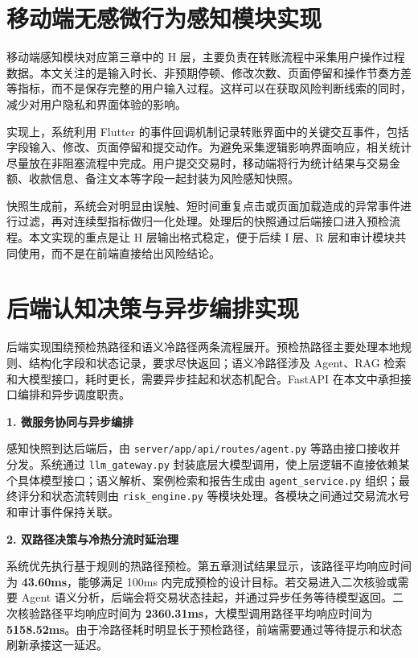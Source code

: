 \documentclass{xduugthesis}
\begin{document}
\section{移动端无感微行为感知模块实现}

移动端感知模块对应第三章中的 H 层，主要负责在转账流程中采集用户操作过程数据。本文关注的是输入时长、非预期停顿、修改次数、页面停留和操作节奏方差等指标，而不是保存完整的用户输入过程。这样可以在获取风险判断线索的同时，减少对用户隐私和界面体验的影响\cite{li2024cognitive}。

实现上，系统利用 Flutter 的事件回调机制记录转账界面中的关键交互事件，包括字段输入、修改、页面停留和提交动作。为避免采集逻辑影响界面响应，相关统计尽量放在非阻塞流程中完成。用户提交交易时，移动端将行为统计结果与交易金额、收款信息、备注文本等字段一起封装为风险感知快照。

快照生成前，系统会对明显由误触、短时间重复点击或页面加载造成的异常事件进行过滤，再对连续型指标做归一化处理。处理后的快照通过后端接口进入预检流程。本文实现的重点是让 H 层输出格式稳定，便于后续 I 层、R 层和审计模块共同使用，而不是在前端直接给出风险结论。

\section{后端认知决策与异步编排实现}

后端实现围绕预检热路径和语义冷路径两条流程展开。预检热路径主要处理本地规则、结构化字段和状态记录，要求尽快返回；语义冷路径涉及 Agent、RAG 检索和大模型接口，耗时更长，需要异步挂起和状态机配合。FastAPI 在本文中承担接口编排和异步调度职责。

\textbf{1. 微服务协同与异步编排}

感知快照到达后端后，由 \texttt{server/app/api/routes/agent.py} 等路由接口接收并分发。系统通过 \texttt{llm\_gateway.py} 封装底层大模型调用，使上层逻辑不直接依赖某个具体模型接口；语义解析、案例检索和报告生成由 \texttt{agent\_service.py} 组织；最终评分和状态流转则由 \texttt{risk\_engine.py} 等模块处理。各模块之间通过交易流水号和审计事件保持关联。

\textbf{2. 双路径决策与冷热分流时延治理}

系统优先执行基于规则的热路径预检。第五章测试结果显示，该路径平均响应时间为 \textbf{43.60ms}，能够满足 100ms 内完成预检的设计目标。若交易进入二次核验或需要 Agent 语义分析，后端会将交易状态挂起，并通过异步任务等待模型返回。二次核验路径平均响应时间为 \textbf{2360.31ms}，大模型调用路径平均响应时间为 \textbf{5158.52ms}。由于冷路径耗时明显长于预检路径，前端需要通过等待提示和状态刷新承接这一延迟。
\end{document}

